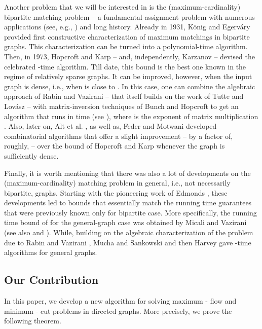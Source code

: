 \documentclass[11pt, letterpaper]{article}
\begin{document}
  Another problem that we will be interested in is the (maximum-cardinality) bipartite matching problem -- a fundamental assignment problem with numerous applications (see, e.g., \cite{AhujaMO93,LovaszP86}) and long history. Already in 1931, K\"onig \cite{Konig31} and Egerv\'ary \cite{Egervary31} provided first constructive characterization of maximum matchings in bipartite graphs. This characterization can be turned into a polynomial-time algorithm. Then, in 1973, Hopcroft and Karp \cite{HopcroftK73} -- and, independently, Karzanov \cite{Karzanov73} -- devised the celebrated -time algorithm. Till date, this bound is the best one known in the regime of relatively sparse graphs. It can be improved, however, when the input graph is dense, i.e., when  is close to . In this case, one can combine the algebraic approach of Rabin and Vazirani \cite{RabinV89} -- that itself builds on the work of Tutte \cite{Tutte47} and Lov\'asz \cite{Lovasz79} -- with matrix-inversion techniques of Bunch and Hopcroft \cite{BunchH74} to get an algorithm that runs in  time (see \cite{Mucha05}), where  is the exponent of matrix multiplication \cite{CoppersmithW90, Vassilevska12}. Also, later on, Alt et al. \cite{AltBMP91}, as well as, Feder and Motwani \cite{FederM95} developed combinatorial algorithms that offer a slight improvement -- by a factor of, roughly,  -- over the  bound of Hopcroft and Karp whenever the graph is sufficiently dense. 
  
  Finally, it is worth mentioning that there was also a lot of developments on the (maximum-cardinality) matching problem in general, i.e., not necessarily bipartite, graphs. Starting with the pioneering work of Edmonds \cite{Edmonds65}, these developments led to bounds that essentially match the running time guarantees that were previously known only for bipartite case. More specifically, the running time bound of  for the general-graph case was obtained by Micali and Vazirani \cite{MicaliV80,Vazirani94} (see also \cite{GabowT91} and \cite{GoldbergK04}). While, building on the algebraic characterization of the problem due to Rabin and Vazirani \cite{RabinV89}, Mucha and Sankowski \cite{MuchaS04} and then Harvey \cite{Harvey09} gave -time algorithms for general graphs.
  
\subsection{Our Contribution}

In this paper, we develop a new algorithm for solving maximum - flow and minimum - cut problems in directed graphs. More precisely, we prove the following theorem.
  
\end{document}

